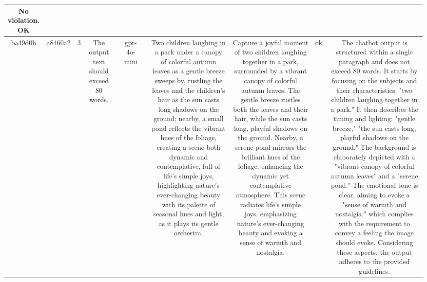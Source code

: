 \begin{table}[h!]
\begin{tabular}{|c|c|c|c|c|c|c|c|c|c|c|}
No violation.
OK\\
\hline
ba49d0b & a8460a2 & 3 & The output text should exceed 80 words. &  & gpt-4o-mini &  & Two children laughing in a park under a canopy of colorful autumn leaves as a gentle breeze sweeps by, rustling the leaves and the children's hair as the sun casts long shadows on the ground; nearby, a small pond reflects the vibrant hues of the foliage, creating a scene both dynamic and contemplative, full of life's simple joys, highlighting nature's ever-changing beauty with its palette of seasonal hues and light, as it plays its gentle orchestra. & Capture a joyful moment of two children laughing together in a park, surrounded by a vibrant canopy of colorful autumn leaves. The gentle breeze rustles both the leaves and their hair, while the sun casts long, playful shadows on the ground. Nearby, a serene pond mirrors the brilliant hues of the foliage, enhancing the dynamic yet contemplative atmosphere. This scene radiates life's simple joys, emphasizing nature's ever-changing beauty and evoking a sense of warmth and nostalgia. & ok & The chatbot output is structured within a single paragraph and does not exceed 80 words. It starts by focusing on the subjects and their characteristics: "two children laughing together in a park." It then describes the timing and lighting: "gentle breeze," "the sun casts long, playful shadows on the ground." The background is elaborately depicted with a "vibrant canopy of colorful autumn leaves" and a "serene pond." The emotional tone is clear, aiming to evoke a "sense of warmth and nostalgia," which complies with the requirement to convey a feeling the image should evoke. Considering these aspects, the output adheres to the provided guidelines. 


\end{tabular}
\end{table}
